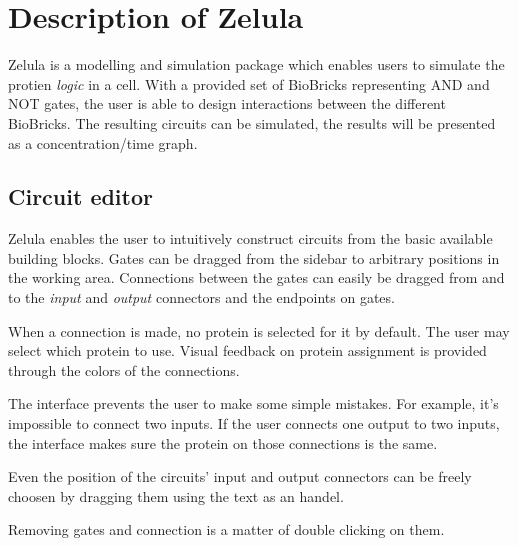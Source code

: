 \section{Description of Zelula}
Zelula is a modelling and simulation package which enables users to simulate the protien \textit{logic} in a cell. With a provided set of BioBricks representing AND and NOT gates, the user is able to design interactions between the different BioBricks. The resulting circuits can be simulated, the results will be presented as a concentration/time graph.


\newcommand{\screenshotScale}{1.4}

\subsection{Circuit editor}
\begin{figure}[h!]
\centering{}
\end{figure}

\noindent Zelula enables the user to intuitively construct circuits from the basic available building blocks. Gates can be dragged from the sidebar to arbitrary positions in the working area. Connections between the gates can easily be dragged from and to the \textit{input} and \textit{output} connectors and the endpoints on gates. 

When a connection is made, no protein is selected for it by default. The user may select which protein to use. Visual feedback on protein assignment is provided through the colors of the connections.

The interface prevents the user to make some simple mistakes. For example, it's impossible to connect two inputs. If the user connects one output to two inputs, the interface makes sure the protein on those connections is the same.

Even the position of the circuits' input and output connectors can be freely choosen by dragging them using the text as an handel.

Removing gates and connection is a matter of double clicking on them.

